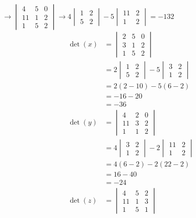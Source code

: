 \documentclass[
  letterpaper,
  DIV=11,
  numbers=noendperiod]{scrartcl}
\begin{document}
\(\longrightarrow \begin{vmatrix} 4 & 5 & 0 \\ 11 & 1 & 2 \\ 1 & 5 & 2\end{vmatrix} \longrightarrow 4\begin{vmatrix}1 & 2 \\ 5 & 2\end{vmatrix}-5\begin{vmatrix}11 & 2 \\ 1 & 2\end{vmatrix} = -132\)
\begin{align*}
\det{(x)} &= \begin{vmatrix}2 & 5 & 0 \\ 3 & 1 & 2 \\ 1 & 5 & 2\end{vmatrix} \\
&= 2\begin{vmatrix}1 & 2 \\ 5 & 2\end{vmatrix}-5\begin{vmatrix}3 & 2 \\ 1 & 2\end{vmatrix} \\
&= 2(2-10)-5(6-2) \\
&= -16-20 \\
&= -36 \\
\det{(y)} &= \begin{vmatrix}4 & 2 & 0 \\ 11 & 3 & 2 \\ 1 & 1 & 2\end{vmatrix} \\
&= 4\begin{vmatrix}3 & 2 \\ 1 & 2\end{vmatrix}-2\begin{vmatrix}11 & 2 \\ 1 & 2\end{vmatrix} \\
&= 4(6-2)-2(22-2) \\
&= 16-40 \\
&= -24 \\
\det{(z)} &= \begin{vmatrix}4 & 5 & 2 \\ 11 & 1 & 3 \\ 1 & 5 & 1\end{vmatrix} \\

\end{align*}
\end{document}
